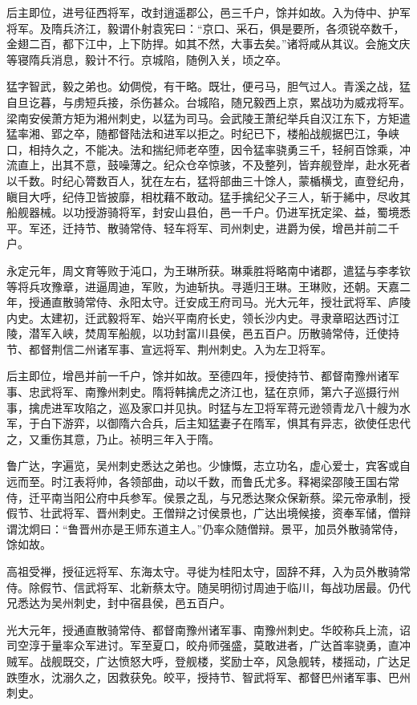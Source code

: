 \documentclass[]{article}
\begin{document}
后主即位，进号征西将军，改封逍遥郡公，邑三千户，馀并如故。入为侍中、护军将军。及隋兵济江，毅谓仆射袁宪曰：``京口、采石，俱是要所，各须锐卒数千，金翅二百，都下江中，上下防捍。如其不然，大事去矣。''诸将咸从其议。会施文庆等寝隋兵消息，毅计不行。京城陷，随例入关，顷之卒。

猛字智武，毅之弟也。幼倜傥，有干略。既壮，便弓马，胆气过人。青溪之战，猛自旦讫暮，与虏短兵接，杀伤甚众。台城陷，随兄毅西上京，累战功为威戎将军。梁南安侯萧方矩为湘州刺史，以猛为司马。会武陵王萧纪举兵自汉江东下，方矩遣猛率湘、郢之卒，随都督陆法和进军以拒之。时纪已下，楼船战舰据巴江，争峡口，相持久之，不能决。法和揣纪师老卒堕，因令猛率骁勇三千，轻舸百馀乘，冲流直上，出其不意，鼓噪薄之。纪众仓卒惊骇，不及整列，皆弃舰登岸，赴水死者以千数。时纪心膂数百人，犹在左右，猛将部曲三十馀人，蒙楯横戈，直登纪舟，瞋目大呼，纪侍卫皆披靡，相枕藉不敢动。猛手擒纪父子三人，斩于絺中，尽收其船舰器械。以功授游骑将军，封安山县伯，邑一千户。仍进军抚定梁、益，蜀境悉平。军还，迁持节、散骑常侍、轻车将军、司州刺史，进爵为侯，增邑并前二千户。

永定元年，周文育等败于沌口，为王琳所获。琳乘胜将略南中诸郡，遣猛与李孝钦等将兵攻豫章，进逼周迪，军败，为迪斩执。寻遁归王琳。王琳败，还朝。天嘉二年，授通直散骑常侍、永阳太守。迁安成王府司马。光大元年，授壮武将军、庐陵内史。太建初，迁武毅将军、始兴平南府长史，领长沙内史。寻隶章昭达西讨江陵，潜军入峡，焚周军船舰，以功封富川县侯，邑五百户。历散骑常侍，迁使持节、都督荆信二州诸军事、宣远将军、荆州刺史。入为左卫将军。

后主即位，增邑并前一千户，馀并如故。至德四年，授使持节、都督南豫州诸军事、忠武将军、南豫州刺史。隋将韩擒虎之济江也，猛在京师，第六子巡摄行州事，擒虎进军攻陷之，巡及家口并见执。时猛与左卫将军蒋元逊领青龙八十艘为水军，于白下游弈，以御隋六合兵，后主知猛妻子在隋军，惧其有异志，欲使任忠代之，又重伤其意，乃止。祯明三年入于隋。

鲁广达，字遍览，吴州刺史悉达之弟也。少慷慨，志立功名，虚心爱士，宾客或自远而至。时江表将帅，各领部曲，动以千数，而鲁氏尤多。释褐梁邵陵王国右常侍，迁平南当阳公府中兵参军。侯景之乱，与兄悉达聚众保新蔡。梁元帝承制，授假节、壮武将军、晋州刺史。王僧辩之讨侯景也，广达出境候接，资奉军储，僧辩谓沈炯曰：``鲁晋州亦是王师东道主人。''仍率众随僧辩。景平，加员外散骑常侍，馀如故。

高祖受禅，授征远将军、东海太守。寻徙为桂阳太守，固辞不拜，入为员外散骑常侍。除假节、信武将军、北新蔡太守。随吴明彻讨周迪于临川，每战功居最。仍代兄悉达为吴州刺史，封中宿县侯，邑五百户。

光大元年，授通直散骑常侍、都督南豫州诸军事、南豫州刺史。华皎称兵上流，诏司空淳于量率众军进讨。军至夏口，皎舟师强盛，莫敢进者，广达首率骁勇，直冲贼军。战舰既交，广达愤怒大呼，登舰楼，奖励士卒，风急舰转，楼摇动，广达足跌堕水，沈溺久之，因救获免。皎平，授持节、智武将军、都督巴州诸军事、巴州刺史。
\end{document}

